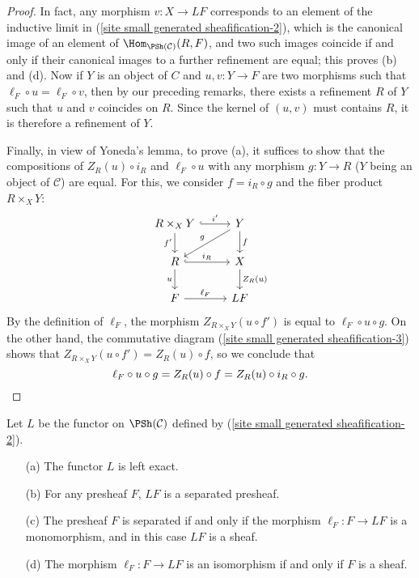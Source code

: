 \begin{proof}
In fact, any morphism $v:X\to LF$ corresponds to an element of the inductive limit in (\ref{site small generated sheafification-2}), which is the canonical image of an element of $\Hom_{\PSh(\mathcal{C})}(R,F)$, and two such images coincide if and only if their canonical images to a further refinement are equal; this proves (b) and (d). Now if $Y$ is an object of $C$ and $u,v:Y\to F$ are two morphisms such that $\ell_F\circ u=\ell_F\circ v$, then by our preceding remarks, there exists a refinement $R$ of $Y$ such that $u$ and $v$ coincides on $R$. Since the kernel of $(u,v)$ must contains $R$, it is therefore a refinement of $Y$.\par
Finally, in view of Yoneda's lemma, to prove (a), it suffices to show that the compositions of $Z_R(u)\circ i_R$ and $\ell_F\circ u$ with any morphism $g:Y\to R$ ($Y$ being an object of $\mathcal{C}$) are equal. For this, we consider $f=i_R\circ g$ and the fiber product $R\times_XY$:
\[\begin{tikzcd}
R\times_XY\ar[r,hook,"i'"]\ar[d,swap,"f'"]&Y\ar[ld,swap,"g"]\ar[d,"f"]\\
R\ar[r,hook,"i_R"]\ar[d,swap,"u"]&X\ar[d,"Z_R(u)"]\\
F\ar[r,"\ell_F"]&LF
\end{tikzcd}\]
By the definition of $\ell_F$, the morphism $Z_{R\times_XY}(u\circ f')$ is equal to $\ell_F\circ u\circ g$. On the other hand, the commutative diagram (\ref{site small generated sheafification-3}) shows that $Z_{R\times_XY}(u\circ f')=Z_R(u)\circ f$, so we conclude that
\begin{equation*}
\ell_F\circ u\circ g=Z_R(u)\circ f=Z_R(u)\circ i_R\circ g.\qedhere
\end{equation*}
\end{proof}
\begin{proposition}\label{site small generated sheafification functor prop}
Let $L$ be the functor on $\PSh(\mathcal{C})$ defined by (\ref{site small generated sheafification-2}).
\begin{enumerate}
\item[(a)] The functor $L$ is left exact.
\item[(b)] For any presheaf $F$, $LF$ is a separated presheaf.
\item[(c)] The presheaf $F$ is separated if and only if the morphism $\ell_F:F\to LF$ is a monomorphism, and in this case $LF$ is a sheaf.
\item[(d)] The morphism $\ell_F:F\to LF$ is an isomorphism if and only if $F$ is a sheaf. 
\end{enumerate} 
\end{proposition}

